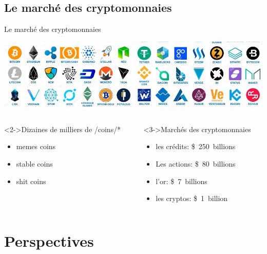 \documentclass[presentation]{beamer}
\begin{document}
\subsection{Le marché des cryptomonnaies}
\label{sec:org2a88793}
\begin{frame}[label={sec:org2c86b16}]{Le marché des cryptomonnaies}
\begin{center}
\includegraphics[width=.9\linewidth]{./Pictures/logos/cryptos.jpeg}
\end{center}

\begin{columns}
\begin{column}{0.4\columnwidth}
\begin{block}<2->{Dizaines de milliers de /coins/*}
\begin{itemize}
\item <2>memes coins
\item <2>stable coins
\item <2>shit coins
\end{itemize}

\end{block}
\end{column}

\begin{column}{0.6\columnwidth}
\begin{block}<3->{Marchés des cryptomonnaies}
\begin{itemize}
\item les crédits: \$~250~billions
\item Les actions: \$~80~billions
\item l'or: \$~7~billions
\item \alert{les cryptos: \$~1~billion}
\end{itemize}
\end{block}
\end{column}
\end{columns}
\end{frame}

\section{Perspectives}
\label{sec:org632896f}
\end{document}

